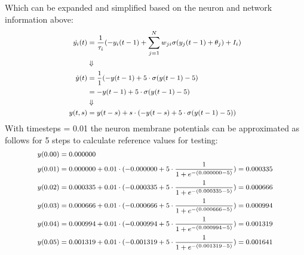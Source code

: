 \documentclass[a4paper]{article}
\begin{document}
Which can be expanded and simplified based on the neuron and network information above:
\begin{equation}
  \footnotesize
  \begin{aligned}
    \dot{y_i}(t) & = \frac{1}{\tau_i}(-y_i(t-1) + \sum_{j=1}^{N}w_{ji}\sigma(y_j(t-1) + \theta_j) + I_i)\\
    & \Downarrow\\
    \dot{y}(t) & = \frac{1}{1}(-y(t-1) + 5 \cdot \sigma(y(t - 1) - 5)\\
    & = -y(t-1) + 5 \cdot \sigma(y(t-1) - 5)\\
    & \Downarrow\\
    y(t,s) & = y(t-s) + s \cdot (-y(t-s) + 5 \cdot \sigma(y(t-1) - 5))
  \end{aligned}
\end{equation}
With timesteps = 0.01 the neuron membrane potentials can be approximated as follows for 5 steps to calculate reference values for testing:
\begin{equation}
  \footnotesize
  \begin{aligned}
    y(0.00) & = 0.000000\\
    y(0.01) & = 0.000000 + 0.01 \cdot (-0.000000 + 5 \cdot \frac{1}{1 + e^{-(0.000000 - 5)}}) = 0.000335\\
    y(0.02) & = 0.000335 + 0.01 \cdot (-0.000335 + 5 \cdot \frac{1}{1 + e^{-(0.000335 - 5)}}) = 0.000666\\
    y(0.03) & = 0.000666 + 0.01 \cdot (-0.000666 + 5 \cdot \frac{1}{1 + e^{-(0.000666 - 5)}}) = 0.000994\\
    y(0.04) & = 0.000994 + 0.01 \cdot (-0.000994 + 5 \cdot \frac{1}{1 + e^{-(0.000994 - 5)}}) = 0.001319\\
    y(0.05) & = 0.001319 + 0.01 \cdot (-0.001319 + 5 \cdot \frac{1}{1 + e^{-(0.001319 - 5)}}) = 0.001641\\
  \end{aligned}
\end{equation}
\end{document}
